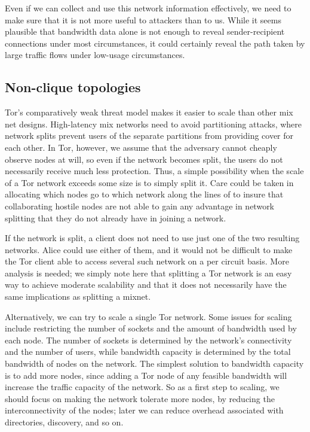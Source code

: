 \documentclass{llncs}
\begin{document}
Even if we can collect and use this network information effectively, we need
to make sure that it is not more useful to attackers than to us.  While it
seems plausible that bandwidth data alone is not enough to reveal
sender-recipient connections under most circumstances, it could certainly
reveal the path taken by large traffic flows under low-usage circumstances.

\subsection{Non-clique topologies}

Tor's comparatively weak threat model makes it easier to scale than
other mix net
designs.  High-latency mix networks need to avoid partitioning attacks, where
network splits prevent users of the separate partitions from providing cover
for each other.  In Tor, however, we assume that the adversary cannot
cheaply observe nodes at will, so even if the network becomes split, the
users do not necessarily receive much less protection.
Thus, a simple possibility when the scale of a Tor network
exceeds some size is to simply split it. Care could be taken in
allocating which nodes go to which network along the lines of
\cite{casc-rep} to insure that collaborating hostile nodes are not
able to gain any advantage in network splitting that they do not
already have in joining a network.

If the network is split, 
a client does not need to use just one of the two resulting networks.
Alice could use either of them, and it would not be difficult to make
the Tor client able to access several such network on a per circuit
basis. More analysis is needed; we simply note here that splitting
a Tor network is an easy way to achieve moderate scalability and that
it does not necessarily have the same implications as splitting a mixnet.

Alternatively, we can try to scale a single Tor network.  Some issues for
scaling include restricting the number of sockets and the amount of bandwidth
used by each node.  The number of sockets is determined by the network's
connectivity and the number of users, while bandwidth capacity is determined
by the total bandwidth of nodes on the network.  The simplest solution to
bandwidth capacity is to add more nodes, since adding a Tor node of any
feasible bandwidth will increase the traffic capacity of the network.  So as
a first step to scaling, we should focus on making the network tolerate more
nodes, by reducing the interconnectivity of the nodes; later we can reduce
overhead associated with directories, discovery, and so on.
\end{document}
